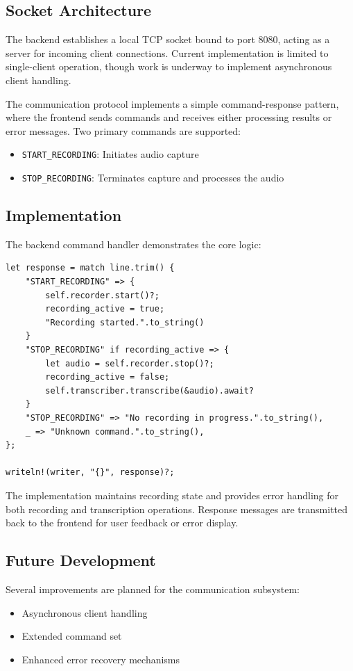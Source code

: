 \subsection{Socket Architecture}
The backend establishes a local TCP socket bound to port 8080, acting as a server for incoming client connections. Current implementation is limited to single-client operation, though work is underway to implement asynchronous client handling.

The communication protocol implements a simple command-response pattern, where the frontend sends commands and receives either processing results or error messages. Two primary commands are supported:
\begin{itemize}
    \item \texttt{START\_RECORDING}: Initiates audio capture
    \item \texttt{STOP\_RECORDING}: Terminates capture and processes the audio
\end{itemize}

\subsection{Implementation}
The backend command handler demonstrates the core logic:

\begin{verbatim}
let response = match line.trim() {
    "START_RECORDING" => {
        self.recorder.start()?;
        recording_active = true;
        "Recording started.".to_string()
    }
    "STOP_RECORDING" if recording_active => {
        let audio = self.recorder.stop()?;
        recording_active = false;
        self.transcriber.transcribe(&audio).await?
    }
    "STOP_RECORDING" => "No recording in progress.".to_string(),
    _ => "Unknown command.".to_string(),
};

writeln!(writer, "{}", response)?;
\end{verbatim}

The implementation maintains recording state and provides error handling for both recording and transcription operations. Response messages are transmitted back to the frontend for user feedback or error display.

\subsection{Future Development}
Several improvements are planned for the communication subsystem:
\begin{itemize}
    \item Asynchronous client handling
    \item Extended command set
    \item Enhanced error recovery mechanisms
\end{itemize}

